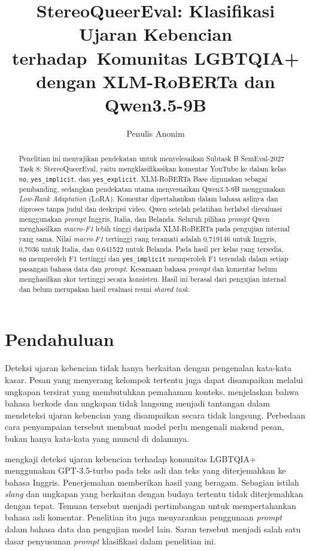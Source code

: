 \documentclass[11pt]{article}
\title{StereoQueerEval: Klasifikasi Ujaran Kebencian terhadap\
Komunitas LGBTQIA+ dengan XLM-RoBERTa dan Qwen3.5-9B}
\author{Penulis Anonim}
\begin{document}
\nolinenumbers
\raggedbottom
\maketitle
\begin{abstract}
Penelitian ini menyajikan pendekatan untuk menyelesaikan Subtask B SemEval-2027 Task 8: StereoQueerEval, yaitu mengklasifikasikan komentar YouTube ke dalam kelas \texttt{no}, \texttt{yes\_implicit}, dan \texttt{yes\_explicit}. XLM-RoBERTa Base digunakan sebagai pembanding, sedangkan pendekatan utama menyesuaikan Qwen3.5-9B menggunakan \textit{Low-Rank Adaptation} (LoRA). Komentar dipertahankan dalam bahasa aslinya dan diproses tanpa judul dan deskripsi video. Qwen setelah pelatihan berlabel dievaluasi menggunakan \textit{prompt} Inggris, Italia, dan Belanda. Seluruh pilihan \textit{prompt} Qwen menghasilkan \textit{macro-F1} lebih tinggi daripada XLM-RoBERTa pada pengujian internal yang sama. Nilai \textit{macro-F1} tertinggi yang teramati adalah 0,719146 untuk Inggris, 0,7036 untuk Italia, dan 0,641522 untuk Belanda. Pada hasil per kelas yang tersedia, \texttt{no} memperoleh F1 tertinggi dan \texttt{yes\_implicit} memperoleh F1 terendah dalam setiap pasangan bahasa data dan \textit{prompt}. Kesamaan bahasa \textit{prompt} dan komentar belum menghasilkan skor tertinggi secara konsisten. Hasil ini berasal dari pengujian internal dan belum merupakan hasil evaluasi resmi \textit{shared task}.
\end{abstract}

\section{Pendahuluan}
\label{sec:pendahuluan}
Deteksi ujaran kebencian tidak hanya berkaitan dengan pengenalan kata-kata kasar. Pesan yang menyerang kelompok tertentu juga dapat disampaikan melalui ungkapan tersirat yang membutuhkan pemahaman konteks. \citet{elsherief-etal-2021-latent} menjelaskan bahwa bahasa berkode dan ungkapan tidak langsung menjadi tantangan dalam mendeteksi ujaran kebencian yang disampaikan secara tidak langsung. Perbedaan cara penyampaian tersebut membuat model perlu mengenali maksud pesan, bukan hanya kata-kata yang muncul di dalamnya.

\citet{chan-etal-2024-hate} mengkaji deteksi ujaran kebencian terhadap komunitas LGBTQIA+ menggunakan GPT-3.5-turbo pada teks asli dan teks yang diterjemahkan ke bahasa Inggris. Penerjemahan memberikan hasil yang beragam. Sebagian istilah \textit{slang} dan ungkapan yang berkaitan dengan budaya tertentu tidak diterjemahkan dengan tepat. Temuan tersebut menjadi pertimbangan untuk mempertahankan bahasa asli komentar. Penelitian itu juga menyarankan penggunaan \textit{prompt} dalam bahasa data dan pengujian model lain. Saran tersebut menjadi salah satu dasar penyusunan \textit{prompt} klasifikasi dalam penelitian ini.
\end{document}
